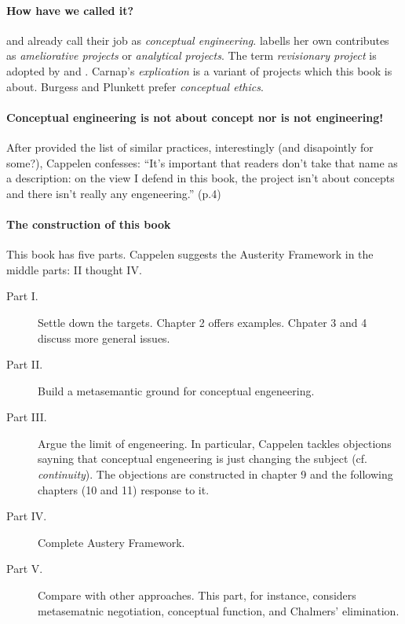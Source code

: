 \documentclass[
10pt, %
a4paper, %
twocolumn, %
landscape %
]{article}
\begin{document}
\paragraph{How have we called it?}
 \cite{Blackburn1999} and \cite{Eklund2010} already call their job as \emph{conceptual engineering}.
 \cite{Haslanger2012} labells her own contributes as \emph{ameliorative projects} or \emph{analytical projects}.
The term \emph{revisionary project} is adopted by \cite{Railton1993} and \cite{Scharp2013}.
Carnap's \emph{explication} is a variant of projects which this book is about.
Burgess and Plunkett prefer \emph{conceptual ethics}.

\paragraph{Conceptual engineering is not about concept nor is not engineering!}
After provided the list of similar practices, interestingly (and disapointly for some?), Cappelen confesses:
``It's important that readers don't take that name as a description: on the view I defend in this book, the project isn't about concepts and there isn't really any engeneering.'' (p.4)

\paragraph{The construction of this book}
This book has five parts. Cappelen suggests the Austerity Framework in the middle parts: II thought IV.

\begin{description}
\item[Part I.] Settle down the targets.
Chapter 2 offers examples. Chpater 3 and 4 discuss more general issues.
\item[Part II.] Build a metasemantic ground for conceptual engeneering.
\item[Part III.] Argue the limit of engeneering.
In particular, Cappelen tackles objections sayning that conceptual engeneering is just changing the subject (cf. \emph{continuity}).
The objections are constructed in chapter 9 and the following chapters (10 and 11) response to it.
\item[Part IV.] Complete Austery Framework.
\item[Part V.] Compare with other approaches.
This part, for instance, considers metasematnic negotiation, conceptual function, and Chalmers' elimination.
\end{description}
\end{document}
